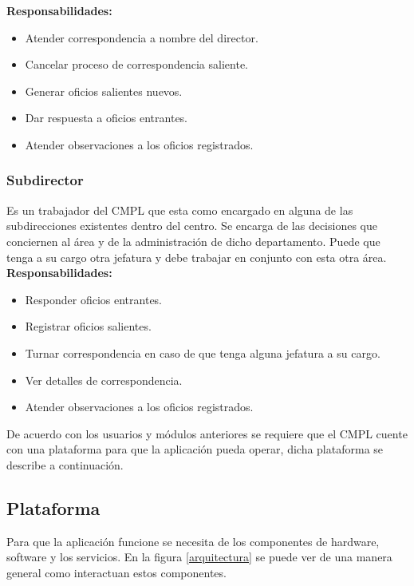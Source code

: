 \textbf{Responsabilidades:}
\begin{itemize}
	\item Atender correspondencia a nombre del director.
	\item Cancelar proceso de correspondencia saliente.
	\item Generar oficios salientes nuevos.
	\item Dar respuesta a oficios entrantes.
	\item Atender observaciones a los oficios registrados.
\end{itemize}

\subsubsection{Subdirector}
Es un trabajador del CMPL que esta como encargado en alguna de las subdirecciones existentes dentro del centro. Se encarga de las decisiones que conciernen al área y de la administración de dicho departamento. Puede que tenga a su cargo otra jefatura y debe trabajar en conjunto con esta otra área.\\ 

\textbf{Responsabilidades:}
\begin{itemize}
	\item Responder oficios entrantes.
	\item Registrar oficios salientes.
	\item Turnar correspondencia en caso de que tenga alguna jefatura a su cargo.
	\item Ver detalles de correspondencia.
	\item Atender observaciones a los oficios registrados.
\end{itemize}

De acuerdo con los usuarios y módulos anteriores se requiere que el CMPL cuente con una plataforma para que la aplicación pueda operar, dicha plataforma se describe a continuación. \\

\subsection{Plataforma}

Para que la aplicación funcione se necesita de los componentes de hardware, software y los servicios. En la figura \ref{arquitectura} se puede ver de una manera general como interactuan estos componentes. \\

